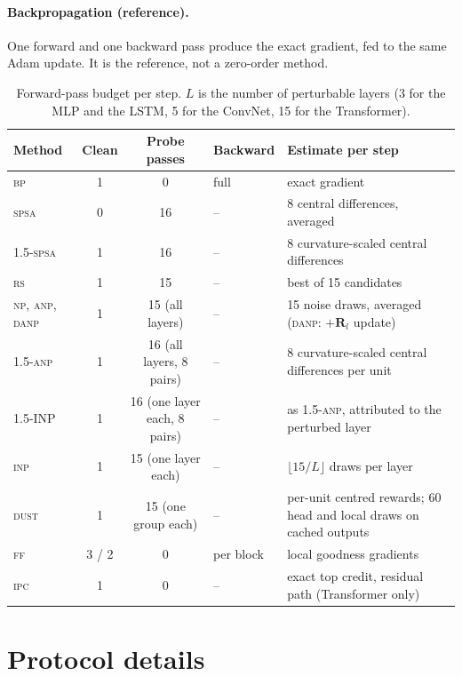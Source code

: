 \documentclass{article}
\newcommand{\method}[1]{\textsc{#1}}
\newcommand{\BP}{\method{bp}}
\newcommand{\SPSA}{\method{spsa}}
\newcommand{\SPSAb}{\method{1.5-spsa}}
\newcommand{\RS}{\method{rs}}
\newcommand{\NP}{\method{np}}
\newcommand{\ANP}{\method{anp}}
\newcommand{\ANPb}{\method{1.5-anp}}
\newcommand{\INP}{\method{inp}}
\newcommand{\DANP}{\method{danp}}
\newcommand{\FF}{\method{ff}}
\newcommand{\DUST}{\method{dust}}
\newcommand{\IPC}{\method{ipc}}
\newcommand{\bR}{\mathbf{R}}
\begin{document}
\paragraph{Backpropagation (reference).}
One forward and one backward pass produce the exact gradient, fed to the same Adam
update. It is the reference, not a zero-order method.

\begin{table}[t]
  \caption{Forward-pass budget per step. $L$ is the number of perturbable layers (3 for
  the MLP and the LSTM, 5 for the ConvNet, 15 for the Transformer).}
  \label{tab:budget}
  \centering
  \scriptsize
  \setlength{\tabcolsep}{3.5pt}
  \begin{tabular}{lccll}
    \toprule
    Method & Clean & Probe passes & Backward & Estimate per step \\
    \midrule
    \BP{}    & 1 & 0  & full      & exact gradient \\
    \SPSA{}  & 0 & 16 & --        & 8 central differences, averaged \\
    \SPSAb{} & 1 & 16 & --        & 8 curvature-scaled central differences \\
    \RS{}    & 1 & 15 & --        & best of 15 candidates \\
    \NP{}, \ANP{}, \DANP{} & 1 & 15 (all layers) & -- & 15 noise draws, averaged (\DANP{}: $+\bR_l$ update) \\
    \ANPb{}  & 1 & 16 (all layers, 8 pairs) & -- & 8 curvature-scaled central differences per unit \\
    1.5-INP  & 1 & 16 (one layer each, 8 pairs) & -- & as \ANPb{}, attributed to the perturbed layer \\
    \INP{}   & 1 & 15 (one layer each) & -- & $\lfloor 15/L\rfloor$ draws per layer \\
    \DUST{}  & 1 & 15 (one group each) & -- & per-unit centred rewards; 60 head and local draws on cached outputs \\
    \FF{}    & 3 / 2 & 0 & per block & local goodness gradients \\
    \IPC{}   & 1 & 0 & -- & exact top credit, residual path (Transformer only) \\
    \bottomrule
  \end{tabular}
\end{table}

\section{Protocol details}
\label{app:protocol}
\end{document}
